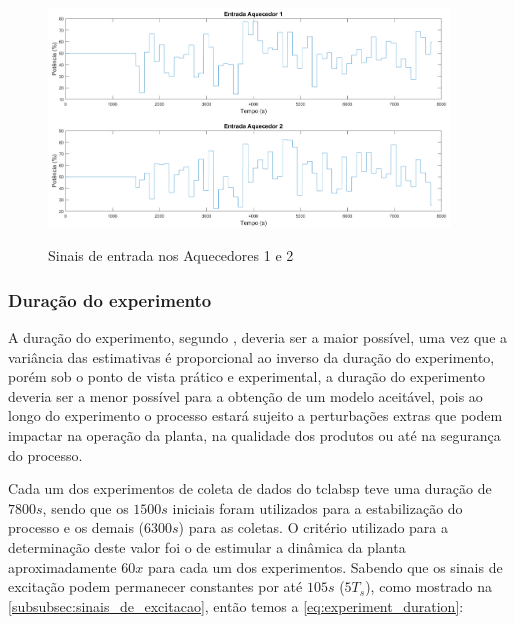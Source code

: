 \begin{figure}[h]
	\caption{Sinais de entrada nos Aquecedores 1 e 2}
	\begin{center}
		\includegraphics[width=0.95\textwidth]{./5_images/inputs_H1H2.png} 
		\label{fig:experiment_inputs}
	\end{center}
	\centering
\end{figure}

\subsubsection{Duração do experimento}
\label{subsubsec:duracao_do_experimento}

A duração do experimento, segundo , deveria ser
a maior possível, uma vez que a variância das estimativas é proporcional ao inverso da duração do
experimento, porém sob o ponto de vista prático e experimental, a duração do experimento deveria ser
a menor possível para a obtenção de um modelo aceitável, pois ao longo do experimento o processo
estará sujeito a perturbações extras que podem impactar na operação da planta, na qualidade dos
produtos ou até na segurança do processo.

Cada um dos experimentos de coleta de dados do \acrshort{tclabsp} teve uma duração de $7800s$,
sendo que os $1500s$ iniciais foram utilizados para a estabilização do processo e os demais ($6300s$)
para as coletas. O critério utilizado para a determinação deste valor foi o de estimular a dinâmica
da planta aproximadamente $60x$ para cada um dos experimentos. Sabendo que os sinais de excitação
podem permanecer constantes por até $105s$ ($5T_s$), como mostrado na \cref{subsubsec:sinais_de_excitacao},
então temos a \cref{eq:experiment_duration}:

